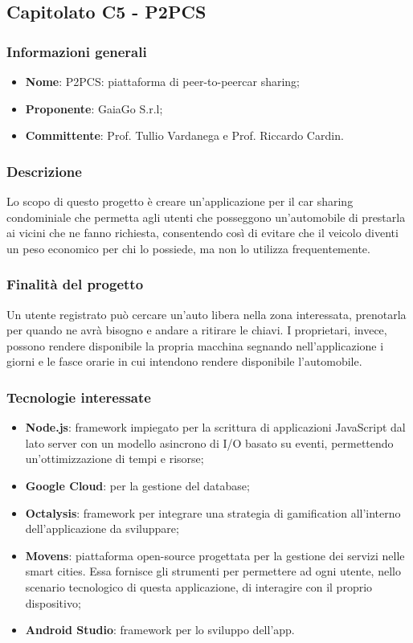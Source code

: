 \subsection{Capitolato C5 - P2PCS}
\subsubsection{Informazioni generali}
\begin{itemize}
\item \textbf{Nome}: P2PCS: piattaforma di peer-to-peer\glo car sharing;
\item \textbf{Proponente}: GaiaGo S.r.l;
\item \textbf{Committente}: Prof. Tullio Vardanega e Prof. Riccardo Cardin.
\end{itemize}
\subsubsection{Descrizione}
Lo scopo di questo progetto è creare un'applicazione per il car sharing 
condominiale che permetta agli utenti che posseggono un'automobile di prestarla 
ai vicini che ne fanno richiesta, consentendo così di evitare che il veicolo 
diventi un peso economico per chi lo possiede, ma non lo utilizza frequentemente.

\subsubsection{Finalità del progetto}
Un utente registrato può cercare un'auto libera nella zona interessata, 
prenotarla per quando ne avrà bisogno e andare a ritirare le chiavi. I 
proprietari, invece, possono rendere disponibile la propria macchina segnando nell'applicazione i giorni e le fasce orarie in cui intendono rendere disponibile l'automobile.

\subsubsection{Tecnologie interessate}
\begin{itemize}
	\item \textbf{Node.js\glo}: framework\glo{} impiegato per la scrittura di applicazioni 
JavaScript dal lato server con un modello asincrono di I/O basato su eventi, 
permettendo un'ottimizzazione di tempi e risorse;
	\item \textbf{Google Cloud}: per la gestione del database;
	\item \textbf{Octalysis}: framework\glo{} per integrare una strategia di gamification\glo{} all'interno dell'applicazione da sviluppare;
	\item \textbf{Movens}: piattaforma open-source\glo{} progettata per la gestione dei servizi nelle smart cities. Essa fornisce gli strumenti per permettere ad ogni	utente, nello scenario tecnologico di questa applicazione, di interagire con il proprio dispositivo;
	\item \textbf{Android Studio}: framework\glo{} per lo sviluppo dell'app.
\end{itemize}

